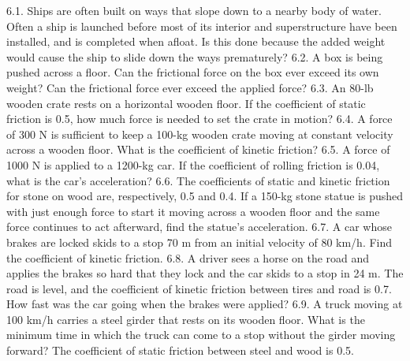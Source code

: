 







6.1. Ships are often built on ways that slope down to a nearby body of water. Often a ship is launched before most of its
interior and superstructure have been installed, and is completed when afloat. Is this done because the added weight
would cause the ship to slide down the ways prematurely?
6.2. A box is being pushed across a floor. Can the frictional force on the box ever exceed its own weight? Can the frictional
force ever exceed the applied force?
6.3. An 80-lb wooden crate rests on a horizontal wooden floor. If the coefficient of static friction is 0.5, how much force
is needed to set the crate in motion?
6.4. A force of 300 N is sufficient to keep a 100-kg wooden crate moving at constant velocity across a wooden floor. What
is the coefficient of kinetic friction?
6.5. A force of 1000 N is applied to a 1200-kg car. If the coefficient of rolling friction is 0.04, what is the car’s acceleration?
6.6. The coefficients of static and kinetic friction for stone on wood are, respectively, 0.5 and 0.4. If a 150-kg stone statue is
pushed with just enough force to start it moving across a wooden floor and the same force continues to act afterward,
find the statue’s acceleration.
6.7. A car whose brakes are locked skids to a stop 70 m from an initial velocity of 80 km/h. Find the coefficient of kinetic
friction.
6.8. A driver sees a horse on the road and applies the brakes so hard that they lock and the car skids to a stop in 24 m. The
road is level, and the coefficient of kinetic friction between tires and road is 0.7. How fast was the car going when the
brakes were applied?
6.9. A truck moving at 100 km/h carries a steel girder that rests on its wooden floor. What is the minimum time in which
the truck can come to a stop without the girder moving forward? The coefficient of static friction between steel and
wood is 0.5.

